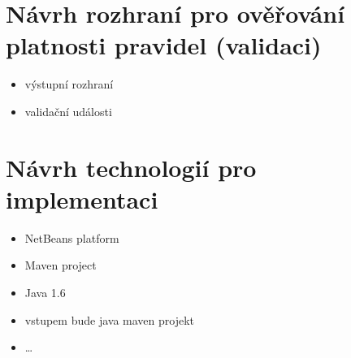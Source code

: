 \section{Návrh rozhraní pro ověřování platnosti pravidel (validaci)}
\begin{itemize}
\item výstupní rozhraní
\item validační události
\end{itemize}

%
%

\section{Návrh technologií pro implementaci}
\begin{itemize}
\item NetBeans platform
\item Maven project
\item Java 1.6
\item vstupem bude java maven projekt
\item \ldots
\end{itemize}
